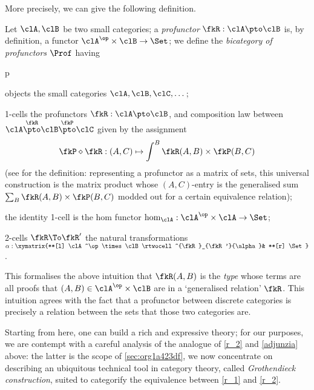 More precisely, we can give the following definition.
\begin{definition}[Profunctor]\label{def_profu}
	Let $\clA,\clB$ be two small categories; a \emph{profunctor} $\fkR : \clA \pto \clB$ is, by definition, a functor $\clA^\op\times\clB \to \Set$; we define the \emph{bicategory of profunctors} $\Prof$ having
	\begin{enumtag}{p}
		\item objects the small categories $\clA,\clB,\clC,\dots$;
		\item 1-cells the profunctors $\fkR : \clA \pto \clB$, and composition law between $\clA \overset{\fkR}{\pto} \clB \overset{\fkP}{\pto} \clC$ given by the assignment
		\[ \fkP\diamond \fkR : (A,C)\mapsto \int^B \fkR(A,B)\times\fkP(B,C) \]
		(see \cite[6.2.10]{Bor2} for the definition: representing a profunctor as a matrix of sets, this universal construction is the matrix product whose $(A,C)$-entry is the generalised sum $\sum_B \fkR(A,B)\times\fkP(B,C)$ modded out for a certain equivalence relation);
		\item the identity 1-cell is the hom functor $\hom_\clA : \clA^\op\times\clA \to \Set$;
		\item 2-cells $\fkR\To\fkR'$ the natural transformations $\alpha : \xymatrix{**[l] \clA^\op\times\clB \rtwocell^{\fkR}_{\fkR'}{\alpha}& **[r] \Set}$.
	\end{enumtag}
\end{definition}
This formalises the above intuition that $\fkR(A,B)$ is the \emph{type} whose terms are all proofs that $(A,B)\in\clA^\op\times\clB$ are in a  `generalised relation' $\fkR$. This intuition agrees with the fact that a profunctor between discrete categories is precisely a relation between the sets that those two categories are.

Starting from here, one can build a rich and expressive theory; for our purposes, we are contempt with a careful analysis of the analogue of \ref{r_2} and \eqref{adjunzia} above: the latter is the scope of \autoref{sec:org1a423df}, we now concentrate on describing an ubiquitous technical tool in category theory, called \emph{Gro\-then\-dieck construction}, suited to categorify the equivalence between \ref{r_1} and \ref{r_2}.

